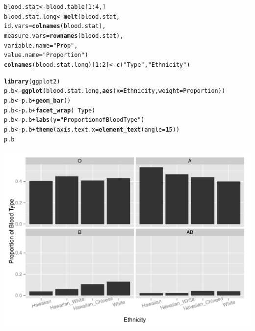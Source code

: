 \documentclass{article}\usepackage[]{graphicx}\usepackage[]{color}
\makeatletter
\def\maxwidth{ %
  \ifdim\Gin@nat@width>\linewidth
    \linewidth
  \else
    \Gin@nat@width
  \fi
}
\newcommand{\hlnum}[1]{\textcolor[rgb]{0.686,0.059,0.569}{#1}}%
\newcommand{\hlstr}[1]{\textcolor[rgb]{0.192,0.494,0.8}{#1}}%
\newcommand{\hlopt}[1]{\textcolor[rgb]{0,0,0}{#1}}%
\newcommand{\hlstd}[1]{\textcolor[rgb]{0.345,0.345,0.345}{#1}}%
\newcommand{\hlkwb}[1]{\textcolor[rgb]{0.69,0.353,0.396}{#1}}%
\newcommand{\hlkwc}[1]{\textcolor[rgb]{0.333,0.667,0.333}{#1}}%
\newcommand{\hlkwd}[1]{\textcolor[rgb]{0.737,0.353,0.396}{\textbf{#1}}}%
\newenvironment{kframe}{%
 \def\at@end@of@kframe{}%
 \ifinner\ifhmode%
  \def\at@end@of@kframe{\end{minipage}}%
  \begin{minipage}{\columnwidth}%
 \fi\fi%
 \def\FrameCommand##1{\hskip\@totalleftmargin \hskip-\fboxsep
 \colorbox{shadecolor}{##1}\hskip-\fboxsep
     \hskip-\linewidth \hskip-\@totalleftmargin \hskip\columnwidth}%
 \MakeFramed {\advance\hsize-\width
   \@totalleftmargin\z@ \linewidth\hsize
   \@setminipage}}%
 {\par\unskip\endMakeFramed%
 \at@end@of@kframe}
\newenvironment{knitrout}{}{} %
\makeatother
\begin{document}
\begin{knitrout}
\color{fgcolor}\begin{kframe}
\begin{alltt}
\hlstd{blood.stat} \hlkwb{<-} \hlstd{blood.table[}\hlnum{1}\hlopt{:}\hlnum{4}\hlstd{,]}
\hlstd{blood.stat.long} \hlkwb{<-} \hlkwd{melt}\hlstd{(blood.stat,}
                        \hlkwc{id.vars} \hlstd{=} \hlkwd{colnames}\hlstd{(blood.stat),}
                        \hlkwc{measure.vars} \hlstd{=} \hlkwd{rownames}\hlstd{(blood.stat),}
                        \hlkwc{variable.name} \hlstd{=} \hlstr{"Prop"}\hlstd{,}
                        \hlkwc{value.name} \hlstd{=} \hlstr{"Proportion"}\hlstd{)}
\hlkwd{colnames}\hlstd{(blood.stat.long)[}\hlnum{1}\hlopt{:}\hlnum{2}\hlstd{]} \hlkwb{<-} \hlkwd{c}\hlstd{(}\hlstr{"Type"}\hlstd{,} \hlstr{"Ethnicity"}\hlstd{)}

\hlkwd{library}\hlstd{(ggplot2)}
\hlstd{p.b} \hlkwb{<-} \hlkwd{ggplot}\hlstd{(blood.stat.long,} \hlkwd{aes}\hlstd{(}\hlkwc{x} \hlstd{= Ethnicity,} \hlkwc{weight} \hlstd{= Proportion))}
\hlstd{p.b} \hlkwb{<-} \hlstd{p.b} \hlopt{+} \hlkwd{geom_bar}\hlstd{()}
\hlstd{p.b} \hlkwb{<-} \hlstd{p.b} \hlopt{+} \hlkwd{facet_wrap}\hlstd{(}\hlopt{~}\hlstd{Type)}
\hlstd{p.b} \hlkwb{<-} \hlstd{p.b} \hlopt{+} \hlkwd{labs}\hlstd{(}\hlkwc{y} \hlstd{=} \hlstr{"Proportion of Blood Type"}\hlstd{)}
\hlstd{p.b} \hlkwb{<-} \hlstd{p.b} \hlopt{+} \hlkwd{theme}\hlstd{(}\hlkwc{axis.text.x} \hlstd{=} \hlkwd{element_text}\hlstd{(}\hlkwc{angle} \hlstd{=} \hlnum{15}\hlstd{))}
\hlstd{p.b}
\end{alltt}
\end{kframe}

{\centering \includegraphics[width=\maxwidth]{figure/5_plot-1} 

}
\end{knitrout}
\end{document}
